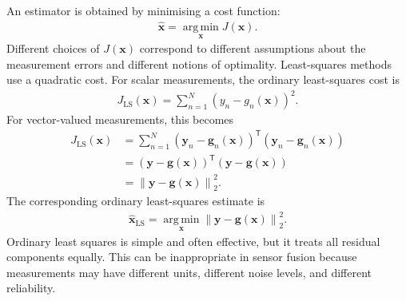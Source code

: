 \documentclass[11pt,oneside,openany]{book}
\begin{document}
An estimator is obtained by minimising a cost function:
\begin{align}
\widehat{\mathbf{x}} = \operatorname*{arg\,min}_{\mathbf{x}} J(\mathbf{x}).
\end{align}
Different choices of $J(\mathbf{x})$ correspond to different assumptions about the measurement errors and different notions of optimality. Least-squares methods use a quadratic cost. For scalar measurements, the ordinary least-squares cost is
\begin{align}
J_{\mathrm{LS}}(\mathbf{x}) = \sum_{n=1}^{N}\left(y_n-g_n(\mathbf{x})\right)^2.
\end{align}
For vector-valued measurements, this becomes
\begin{align}
J_{\mathrm{LS}}(\mathbf{x}) &=\sum_{n=1}^{N}\left(\mathbf{y}_n-\mathbf{g}_n(\mathbf{x})\right)^{\mathsf T}\left(\mathbf{y}_n-\mathbf{g}_n(\mathbf{x})\right) \nonumber \\
&= \left( \mathbf{y} - \mathbf{g}(\mathbf{x}) \right)^{\mathsf T}\left(\mathbf{y}-\mathbf{g}(\mathbf{x})\right) \nonumber \\
& = \left\|\mathbf{y} - \mathbf{g}(\mathbf{x}) \right\|_2^2 . %
\end{align}
The corresponding ordinary least-squares estimate is
\begin{align}
\widehat{\mathbf{x}}_{\mathrm{LS}} = \operatorname*{arg\,min}_{\mathbf{x}} \left\| \mathbf{y} - \mathbf{g}(\mathbf{x}) \right\|_2^2.
\end{align}
Ordinary least squares is simple and often effective, but it treats all residual components equally. This can be inappropriate in sensor fusion because measurements may have different units, different noise levels, and different reliability.
\end{document}
